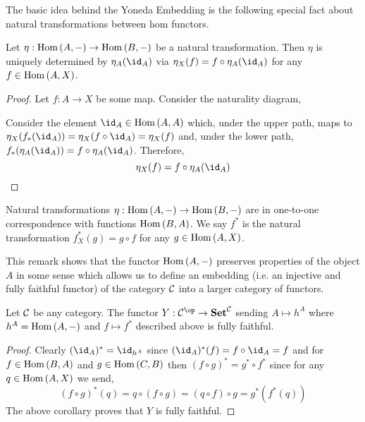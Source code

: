 \documentclass[12pt]{extarticle}
\begin{document}
\begin{rmk}
The basic idea behind the Yoneda Embedding is the following special fact about natural transformations between hom functors. 
\end{rmk}

\begin{lemma}
Let $\eta : \mathrm{Hom}\left( A, - \right) \to \mathrm{Hom}\left( B, - \right)$ be a natural transformation. Then $\eta$ is uniquely determined by $\eta_A(\id_A)$ via $\eta_X(f) = f \circ \eta_A(\id_A)$ for any $f \in \mathrm{Hom}\left( A, X \right)$.  
\end{lemma}

\begin{proof}
Let $f : A \to X$ be some map.
Consider the naturality diagram,
\begin{center}
\end{center}
Consider the element $\id_A \in \Hom{A}{A}$ which, under the upper path, maps to $\eta_X (f_*(\id_A)) = \eta_X(f \circ \id_A) = \eta_X(f)$ and, under the lower path, $f_*(\eta_A(\id_A)) = f \circ \eta_A(\id_A)$. Therefore,
\[ \eta_X(f) = f \circ \eta_A(\id_A) \]
\end{proof}

\begin{corollary}
Natural transformations $\eta : \mathrm{Hom}\left( A, - \right) \to \mathrm{Hom}\left( B, - \right)$ are in one-to-one correspondence with functions $\mathrm{Hom}\left( B, A \right)$. We say $f^*$ is the natural transformation $f^*_X(g) = g \circ f$ for any $g \in \mathrm{Hom}\left( A, X \right)$.  
\end{corollary}

\begin{rmk}
This remark shows that the functor $\mathrm{Hom}\left( A, - \right)$ preserves properties of the object $A$ in some sense which allows us to define an embedding (i.e. an injective and fully faithful functor) of the category $\mathcal{C}$ into a larger category of functors.
\end{rmk}

\begin{theorem}
Let $\mathcal{C}$ be any category. The functor $Y : \C^{\op} \to \Set^{\C}$ sending $A \mapsto h^A$ where $h^A = \mathrm{Hom}\left( A, - \right)$ and $f \mapsto f^*$ described above is fully faithful.
\end{theorem}

\begin{proof}
Clearly $(\id_A)^* = \id_{h^A}$ since $(\id_A)^*(f) = f \circ \id_A = f$ and for $f \in \mathrm{Hom}\left( B, A \right)$ and $g \in \mathrm{Hom}\left( C, B \right)$ then $(f \circ g)^* = g^* \circ f^*$ since for any $q \in \mathrm{Hom}\left( A, X \right)$ we send,
\[ (f \circ g)^*(q) = q \circ (f \circ g) = (q \circ f) \circ g = g^*(f^*(q)) \]
The above corollary proves that $Y$ is fully faithful.    
\end{proof}
\end{document}
